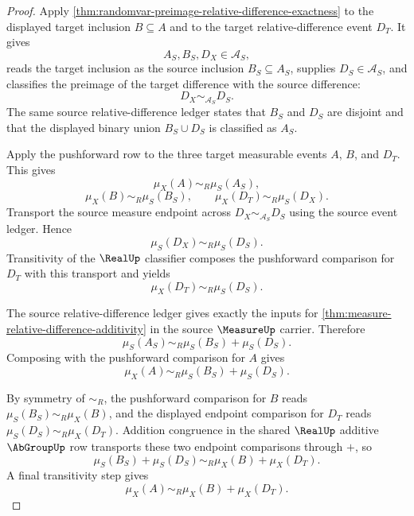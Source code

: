 \begin{proof}
Apply \autoref{thm:randomvar-preimage-relative-difference-exactness} to the displayed target inclusion $B\subseteq A$ and to the target relative-difference event $D_T$. It gives
$$
A_S,B_S,D_X\in\mathcal{A}_S,
$$
reads the target inclusion as the source inclusion $B_S\subseteq A_S$, supplies $D_S\in\mathcal{A}_S$, and classifies the preimage of the target difference with the source difference:
$$
D_X\sim_{\mathcal{A}_S}D_S.
$$
The same source relative-difference ledger states that $B_S$ and $D_S$ are disjoint and that the displayed binary union $B_S\cup D_S$ is classified as $A_S$.

Apply the pushforward row to the three target measurable events $A$, $B$, and $D_T$. This gives
$$
\mu_X(A)\sim_R\mu_S(A_S),
$$
$$
\mu_X(B)\sim_R\mu_S(B_S),\qquad \mu_X(D_T)\sim_R\mu_S(D_X).
$$
Transport the source measure endpoint across $D_X\sim_{\mathcal{A}_S}D_S$ using the source event ledger. Hence
$$
\mu_S(D_X)\sim_R\mu_S(D_S).
$$
Transitivity of the $\RealUp$ classifier composes the pushforward comparison for $D_T$ with this transport and yields
$$
\mu_X(D_T)\sim_R\mu_S(D_S).
$$

The source relative-difference ledger gives exactly the inputs for \autoref{thm:measure-relative-difference-additivity} in the source $\MeasureUp$ carrier. Therefore
$$
\mu_S(A_S)\sim_R\mu_S(B_S)+\mu_S(D_S).
$$
Composing with the pushforward comparison for $A$ gives
$$
\mu_X(A)\sim_R\mu_S(B_S)+\mu_S(D_S).
$$

By symmetry of $\sim_R$, the pushforward comparison for $B$ reads $\mu_S(B_S)\sim_R\mu_X(B)$, and the displayed endpoint comparison for $D_T$ reads $\mu_S(D_S)\sim_R\mu_X(D_T)$. Addition congruence in the shared $\RealUp$ additive $\AbGroupUp$ row transports these two endpoint comparisons through $+$, so
$$
\mu_S(B_S)+\mu_S(D_S)\sim_R\mu_X(B)+\mu_X(D_T).
$$
A final transitivity step gives
$$
\mu_X(A)\sim_R\mu_X(B)+\mu_X(D_T).
$$
\end{proof}

